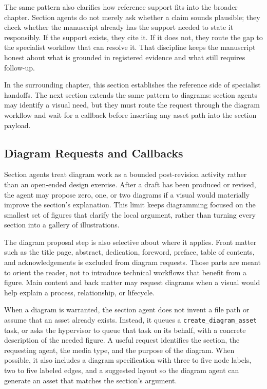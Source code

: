 \documentclass[11pt]{article}
\begin{document}
The same pattern also clarifies how reference support fits into the broader chapter. Section agents do not merely ask whether a claim sounds plausible; they check whether the manuscript already has the support needed to state it responsibly. If the support exists, they cite it. If it does not, they route the gap to the specialist workflow that can resolve it. That discipline keeps the manuscript honest about what is grounded in registered evidence and what still requires follow-up.

In the surrounding chapter, this section establishes the reference side of specialist handoffs. The next section extends the same pattern to diagrams: section agents may identify a visual need, but they must route the request through the diagram workflow and wait for a callback before inserting any asset path into the section payload.



\subsection{Diagram Requests and Callbacks}


Section agents treat diagram work as a bounded post-revision activity rather than an open-ended design exercise. After a draft has been produced or revised, the agent may propose zero, one, or two diagrams if a visual would materially improve the section's explanation. This limit keeps diagramming focused on the smallest set of figures that clarify the local argument, rather than turning every section into a gallery of illustrations.

The diagram proposal step is also selective about where it applies. Front matter such as the title page, abstract, dedication, foreword, preface, table of contents, and acknowledgements is excluded from diagram requests. Those parts are meant to orient the reader, not to introduce technical workflows that benefit from a figure. Main content and back matter may request diagrams when a visual would help explain a process, relationship, or lifecycle.

When a diagram is warranted, the section agent does not invent a file path or assume that an asset already exists. Instead, it queues a \texttt{create\_diagram\_asset} task, or asks the hypervisor to queue that task on its behalf, with a concrete description of the needed figure. A useful request identifies the section, the requesting agent, the media type, and the purpose of the diagram. When possible, it also includes a diagram specification with three to five node labels, two to five labeled edges, and a suggested layout so the diagram agent can generate an asset that matches the section's argument.
\end{document}
